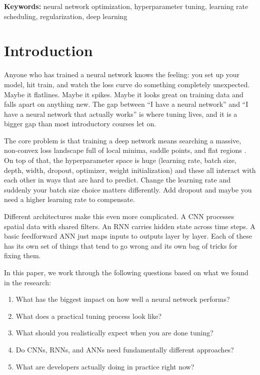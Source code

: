 \documentclass[12pt, letterpaper]{article}
\begin{document}
\textbf{Keywords:} neural network optimization, hyperparameter tuning, learning rate scheduling, regularization, deep learning

\newpage
{
\setlength{\parskip}{2pt}%
\tableofcontents
}
\newpage

\section{Introduction}

Anyone who has trained a neural network knows the feeling: you set up your model, hit train, and watch the loss curve do something completely unexpected. Maybe it flatlines. Maybe it spikes. Maybe it looks great on training data and falls apart on anything new. The gap between ``I have a neural network'' and ``I have a neural network that actually works'' is where tuning lives, and it is a bigger gap than most introductory courses let on.

The core problem is that training a deep network means searching a massive, non-convex loss landscape full of local minima, saddle points, and flat regions \cite{goodfellow2016deep}. On top of that, the hyperparameter space is huge (learning rate, batch size, depth, width, dropout, optimizer, weight initialization) and these all interact with each other in ways that are hard to predict. Change the learning rate and suddenly your batch size choice matters differently. Add dropout and maybe you need a higher learning rate to compensate.

Different architectures make this even more complicated. A CNN processes spatial data with shared filters. An RNN carries hidden state across time steps. A basic feedforward ANN just maps inputs to outputs layer by layer. Each of these has its own set of things that tend to go wrong and its own bag of tricks for fixing them.

In this paper, we work through the following questions based on what we found in the research:

\begin{enumerate}
    \item What has the biggest impact on how well a neural network performs?
    \item What does a practical tuning process look like?
    \item What should you realistically expect when you are done tuning?
    \item Do CNNs, RNNs, and ANNs need fundamentally different approaches?
    \item What are developers actually doing in practice right now?
\end{enumerate}
\end{document}
